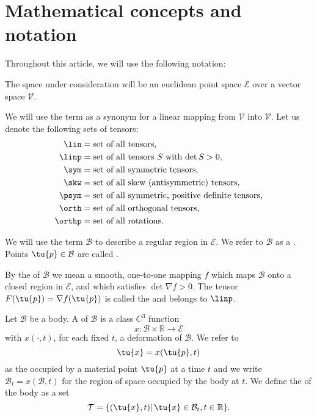 \chapter{Mathematical concepts and notation}

Throughout this article, we will use the following notation:

The space under consideration will be an euclidean point space $\mathcal E$ over
a vector space $\mathcal V$.

We will use the term  as a synonym for a linear mapping 
from $\mathcal V$ into $\mathcal V$. Let us denote the following sets of tensors:
\[
\begin{split}
\lin &= \mbox{set of all tensors,} \\
\linp &= \mbox{set of all tensors $S$ with $\det S > 0$,} \\
\sym &= \mbox{set of all symmetric tensors,} \\
\skw &= \mbox{set of all skew (antisymmetric) tensors,} \\
\psym &= \mbox{set of all symmetric, positive definite tensors,} \\
\orth &= \mbox{set of all orthogonal tensors,} \\
\orthp &= \mbox{set of all rotations.} \\
\end{split}
\]

We will use the term  $\mathcal B$ to describe a regular region in
$\mathcal E$. We refer to $\mathcal B$ as a .
Points $\tu{p} \in \mathcal B$ are called .

By the  of $\mathcal B$ we mean a smooth, one-to-one mapping $f$ 
which maps $\mathcal B$ onto a closed region in $\mathcal E$, and which satisfies 
$\det \nabla f > 0$. The tensor $F(\tu{p})=\nabla f(\tu{p})$ is called the
 and belongs to $\linp$.

Let $\mathcal B$ be a body. A  of $\mathcal B$ is a class $C^3$ function
$$x:\mathcal B \times \mathbb R \rightarrow \mathcal E$$
with $x(\cdot,t)$, for each fixed $t$, a deformation of $\mathcal B$. 
We refer to $$\tu{x}=x(\tu{p},t)$$ as the  occupied by a material point 
$\tu{p}$ at a time $t$ and we write $\mathcal B_t = x(\mathcal B,t)$ for the
region of space occupied by the body at $t$.
We define the  of the body as a set
$$\mathcal T=\{(\tu{x},t)|\,\tu{x}\in\mathcal B_t,t\in\mathbb R\}.$$

